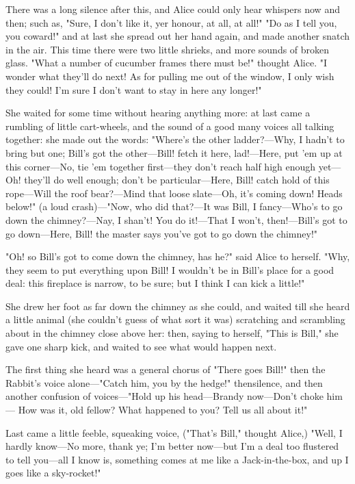 There was a long silence after this, and Alice could only hear whispers now and then; such as, "Sure, I don't like it, yer honour, at all, at all!" "Do as I tell you, you coward!" and at last she spread out her hand again, and made another snatch in the air. This time there were two little shrieks, and more sounds of broken glass. "What a number of cucumber frames there must be!" thought Alice. "I wonder what they'll do next! As for pulling me out of the window, I only wish they could! I'm sure I don't want to stay in here any longer!"

​She waited for some time without hearing anything more: at last came a rumbling of little cart-wheels, and the sound of a good many voices all talking together: she made out the words: "Where's the other ladder?—Why, I hadn't to bring but one; Bill's got the other—Bill! fetch it here, lad!—Here, put 'em up at this corner—No, tie 'em together first—they don't reach half high enough yet—Oh! they'll do well enough; don't be particular—Here, Bill! catch hold of this rope—Will the roof bear?—Mind that loose slate—Oh, it's coming down! Heads below!" (a loud crash)—"Now, who did that?—It was Bill, I fancy—Who's to go down the chimney?—Nay, I shan't! You do it!—That I won't, then!—Bill's got to go down—Here, Bill! the master says you've got to go down the chimney!"

"Oh! so Bill's got to come down the chimney, has he?" said Alice to herself. "Why, they seem to put everything upon Bill! I wouldn't be in Bill's place for a good deal: ​this fireplace is narrow, to be sure; but I think I can kick a little!"

She drew her foot as far down the chimney as she could, and waited till she heard a little animal (she couldn't guess of what sort it was) scratching and scrambling about in the chimney close above her: then, saying to herself, "This is Bill," she gave one sharp kick, and waited to see what would happen next.

The first thing she heard was a general chorus of "There goes Bill!" then the Rabbit's voice alone—"Catch him, you by the hedge!" then ​silence, and then another confusion of voices—"Hold up his head—Brandy now—Don't choke him— How was it, old fellow? What happened to you? Tell us all about it!"

Last came a little feeble, squeaking voice, ("That's Bill," thought Alice,) "Well, I hardly know—No more, thank ye; I'm better now—but I'm a deal too flustered to tell you—all I know is, something comes at me like a Jack-in-the-box, and up I goes like a sky-rocket!"

